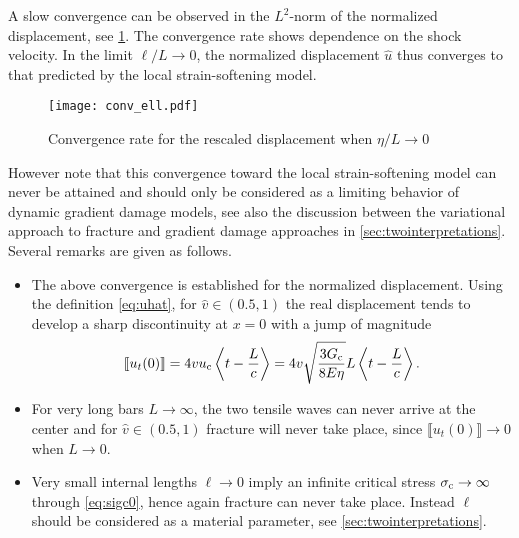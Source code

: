 A slow convergence can be observed in the $L^2$-norm of the normalized displacement, see \cref{fig:conv_ell}. The convergence rate shows dependence on the shock velocity. In the limit $\ell/L\to 0$, the normalized displacement $\widehat{u}$ thus converges to that predicted by the local strain-softening model.
\begin{figure}[htbp]
\centering
\texttt{[image: conv\_ell.pdf]}
\caption{Convergence rate for the rescaled displacement when $\eta/L\to 0$} \label{fig:conv_ell}
\end{figure}

However note that this convergence toward the local strain-softening model can never be attained and should only be considered as a limiting behavior of dynamic gradient damage models, see also the discussion between the variational approach to fracture and gradient damage approaches in \cref{sec:twointerpretations}. Several remarks are given as follows.
\begin{itemize}
\item The above convergence is established for the normalized displacement. Using the definition \eqref{eq:uhat}, for $\widehat{v}\in(0.5,1)$ the real displacement tends to develop a sharp discontinuity at $x=0$ with a jump of magnitude
\[
\llbracket u_t(0)\rrbracket=4vu_{\mathrm{c}}\Braket{t-\frac{L}{c}}=4v\sqrt{\frac{3G_\mathrm{c}}{8E\eta}}L\Braket{t-\frac{L}{c}}.
\]

\item For very long bars $L\to\infty$, the two tensile waves can never arrive at the center and for $\widehat{v}\in(0.5,1)$ fracture will never take place, since $\llbracket u_t(0)\rrbracket\to 0$ when $L\to 0$.

\item Very small internal lengths $\ell\to 0$ imply an infinite critical stress $\sigma_{\mathrm{c}}\to\infty$ through \eqref{eq:sigc0}, hence again fracture can never take place. Instead $\ell$ should be considered as a material parameter, see \cref{sec:twointerpretations}.
\end{itemize}

